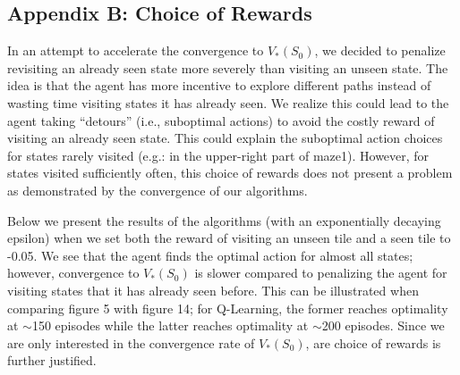 \documentclass[final,12pt,3p]{elsarticle}
\begin{document}
\subsection{Appendix B: Choice of Rewards}

In an attempt to accelerate the convergence to $V_{*}(S_0)$, we decided to penalize revisiting an already seen state more severely than visiting an unseen state. The idea is that the agent has more incentive to explore different paths instead of wasting time visiting states it has already seen. We realize this could lead to the agent taking “detours” (i.e., suboptimal actions) to avoid the costly reward of visiting an already seen state. This could explain the suboptimal action choices for states rarely visited (e.g.: in the upper-right part of maze1). However, for states visited sufficiently often, this choice of rewards does not present a problem as demonstrated by the convergence of our algorithms. 

Below we present the results of the algorithms (with an exponentially decaying epsilon) when we set both the reward of visiting an unseen tile and a seen tile to -0.05. We see that the agent finds the optimal action for almost all states; however, convergence to $V_{*}(S_0)$ is slower compared to penalizing the agent for visiting states that it has already seen before. This can be illustrated when comparing figure 5 with figure 14; for Q-Learning, the former reaches optimality at $\sim$150 episodes while the latter reaches optimality at $\sim$200 episodes. Since we are only interested in the convergence rate of $V_{*}(S_0)$, are choice of rewards is further justified. 
\end{document}
